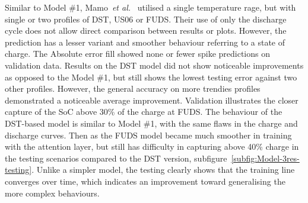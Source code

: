 %
%
Similar to Model \#1, Mamo~\textit{et al.}~\cite{mamo_long_2020} utilised a single temperature rage, but with single or two profiles of DST, US06 or FUDS.
Their use of only the discharge cycle does not allow direct comparison between results or plots.
However, the prediction has a lesser variant and smoother behaviour referring to a state of charge. 
The Absolute error fill showed none or fewer spike predictions on validation data.
Results on the DST model did not show noticeable improvements as opposed to the Model \#1, but still shows the lowest testing error against two other profiles.
However, the general accuracy on more trendies profiles demonstrated a noticeable average improvement.
Validation illustrates the closer capture of the SoC above 30\% of the charge at FUDS.
The behaviour of the DST-based model is similar to Model \#1, with the same flaws in the charge and discharge curves.
Then as the FUDS model became much smoother in training with the attention layer, but still has difficulty in capturing above 40\% charge in the testing scenarios compared to the DST version, subfigure~\ref{subfig:Model-3res-testing}. 
Unlike a simpler model, the testing clearly shows that the training line converges over time, which indicates an improvement toward generalising the more complex behaviours.

%
%

